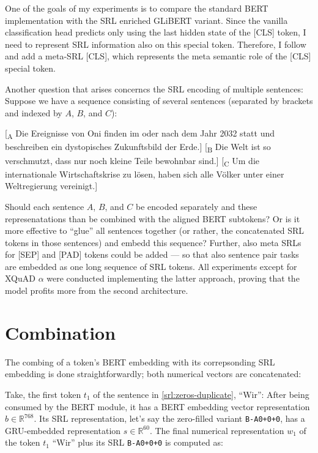 One of the goals of my experiments is to compare the standard BERT implementation with the SRL
enriched GLiBERT variant. Since the vanilla classification head predicts only using the last
hidden state of the [CLS] token, I need to represent SRL information also on this special
token. Therefore, I follow \cite{zhang2019semantics} and add a meta-SRL [CLS], which represents
the meta semantic role of the [CLS] special token.

Another question that arises concerncs the SRL encoding of multiple sentences:
Suppose we have a sequence consisting of several sentences (separated by brackets and indexed by $A$, $B$, and $C$):

\begin{examples}
  \item {[}\textsubscript{A} Die Ereignisse von Oni finden im oder nach dem Jahr 2032 statt und beschreiben ein dystopisches Zukunftsbild der Erde.] [\textsubscript{B} Die Welt ist so verschmutzt, dass nur noch kleine Teile bewohnbar sind.] [\textsubscript{C} Um die internationale Wirtschaftskrise zu lösen, haben sich alle Völker unter einer Weltregierung vereinigt.]
\end{examples}

Should each sentence $A$, $B$, and $C$ be encoded separately and these represenatations than
be combined with the aligned BERT subtokens? Or is it more effective to ``glue'' all sentences
together (or rather, the concatenated SRL tokens in those sentences) and embedd this sequence?
Further, also meta SRLs for [SEP] and [PAD] tokens could be added --- so that also sentence
pair tasks are embedded as one long sequence of SRL tokens. All experiments except for XQuAD
$\alpha$ were conducted implementing the latter approach, proving that the model profits more
from the second architecture.



\section{Combination}

The combing of a token's BERT embedding with its correpsonding SRL embedding is done
straightforwardly; both numerical vectors are concatenated:

Take, the first token $t_1$ of the sentence in \ref{srl:zeros-duplicate},
``Wir'': After being consumed by the BERT module, it has a BERT embedding
vector representation $b \in \mathbb{R}^{768}$. Its SRL representation,
let's say the zero-filled variant \texttt{B-A0+0+0}, has a GRU-embedded
representation $s \in \mathbb{R}^{60}$. The final numerical representation
$w_1$ of the token $t_1$ ``Wir'' plus its SRL \texttt{B-A0+0+0} is computed
as:

